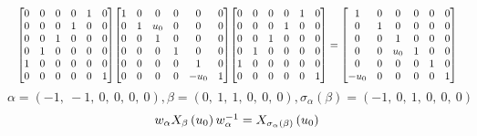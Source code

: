 \documentclass[11pt]{article}
\theoremstyle{definition}
\begin{document}
\[
\scaletoalign{\textwidth}{{\left[\begin{matrix}0 & 0 & 0 & 0 & 1 & 0\\0 & 0 & 0 & 1 & 0 & 0\\0 & 0 & 1 & 0 & 0 & 0\\0 & 1 & 0 & 0 & 0 & 0\\1 & 0 & 0 & 0 & 0 & 0\\0 & 0 & 0 & 0 & 0 & 1\end{matrix}\right]} {\left[\begin{matrix}1 & 0 & 0 & 0 & 0 & 0\\0 & 1 & u_{0} & 0 & 0 & 0\\0 & 0 & 1 & 0 & 0 & 0\\0 & 0 & 0 & 1 & 0 & 0\\0 & 0 & 0 & 0 & 1 & 0\\0 & 0 & 0 & 0 & - u_{0} & 1\end{matrix}\right]} {\left[\begin{matrix}0 & 0 & 0 & 0 & 1 & 0\\0 & 0 & 0 & 1 & 0 & 0\\0 & 0 & 1 & 0 & 0 & 0\\0 & 1 & 0 & 0 & 0 & 0\\1 & 0 & 0 & 0 & 0 & 0\\0 & 0 & 0 & 0 & 0 & 1\end{matrix}\right]} = {\left[\begin{matrix}1 & 0 & 0 & 0 & 0 & 0\\0 & 1 & 0 & 0 & 0 & 0\\0 & 0 & 1 & 0 & 0 & 0\\0 & 0 & u_{0} & 1 & 0 & 0\\0 & 0 & 0 & 0 & 1 & 0\\- u_{0} & 0 & 0 & 0 & 0 & 1\end{matrix}\right]}}
\]
\[
\alpha = \left( -1, \  -1, \  0, \  0, \  0, \  0\right), \beta = \left( 0, \  1, \  1, \  0, \  0, \  0\right), \sigma_{\alpha}(\beta) = \left( -1, \  0, \  1, \  0, \  0, \  0\right)
\]
\[
\scaletoalign{\textwidth}{w_{\alpha} X_{\beta}\left(u_{0}\right) w_{\alpha}^{-1} = X_{\sigma_{\alpha}\left(\beta\right)}\left(u_{0}\right)}
\]
\end{document}
